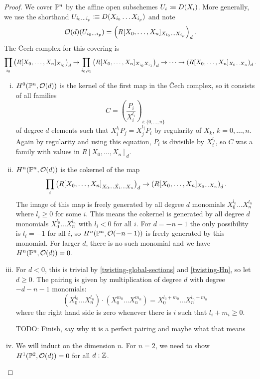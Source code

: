 \begin{proof}
  We cover $\mathbb{P}^n$ by the affine open subschemes $U_i\vcentcolon\mspace{-1.2mu}\equiv D(X_i)$.
  More generally, we use the shorthand $U_{i_0\dots i_p}\vcentcolon\mspace{-1.2mu}\equiv D(X_{i_0}\dots X_{i_p})$
  and note
  \[
    \mathcal O(d)(U_{i_0\dots i_p})=\left(R[X_0,\dots,X_n]_{X_{i_0}\dots X_{i_p}}\right)_d
    \rlap{.}
  \]
  The \v{C}ech complex for this covering is
  \[
    \prod_{i_0}\left(R[X_0,\dots,X_n]_{X_{i_0}}\right)_d \to \prod_{i_0,i_1} \left(R[X_0,\dots,X_n]_{X_{i_0} X_{i_1}}\right)_d \to \dots \to \left(R[X_0,\dots,X_n]_{X_0\dots X_n}\right)_d
    \rlap{.}
  \]
  \begin{enumerate}[(i)]
  \item\label{twisting-global-sections} $H^0(\mathbb{P}^n,\mathcal O(d))$ is the kernel of the first map in the \v{C}ech complex,
    so it consists of all families
    \[
      C=\left(\frac{P_i}{X_{i}^{l_i}}\right)_{i:\{0,\dots,n\}}
    \]
    of degree $d$ elements such that $X_i^{l_i}P_j=X_j^{l_j}P_i$ by regularity of $X_k$, $k=0,\dots,n$.
    Again by regularity and using this equation, $P_i$ is divisible by $X_i^{l_i}$, so $C$ was a family with values in $R[X_0,\dots,X_n]_d$.
  \item\label{twisting-Hn} $H^n(\mathbb{P}^n,\mathcal O(d))$ is the cokernel of the map
    \[
      \prod_{i} \left(R[X_0,\dots,X_n]_{X_0\dots \hat{X_i}\dots X_n}\right)_d \to \left(R[X_0,\dots,X_n]_{X_0\dots X_n}\right)_d
      \rlap{.}
    \]
    The image of this map is freely generated by all degree $d$ monomials $X_0^{l_0}\dots X_n^{l_n}$ where $l_i\geq 0$ for some $i$.
    This means the cokernel is generated by all degree $d$ monomials $X_0^{l_0}\dots X_n^{l_n}$ with $l_i<0$ for all $i$.
    For $d= -n-1$ the only possibility is $l_i=-1$ for all $i$, so $H^n(\mathbb{P}^n,\mathcal O(-n-1))$ is freely generated by this monomial.
    For larger $d$, there is no such monomial and we have $H^n(\mathbb{P}^n,\mathcal O(d))=0$.
  \item For $d<0$, this is trivial by \ref{twisting-global-sections} and \ref{twisting-Hn}, so let $d\geq 0$.
    The pairing is given by multiplication of degree $d$ with degree $-d-n-1$ monomials:
    \[
      (X_0^{l_0}\dots X_n^{l_n}) \cdot (X_0^{m_0}\dots X_n^{m_n})=X_0^{l_0+m_0}\dots X_n^{l_n+m_n}
    \]
    where the right hand side is zero whenever there is $i$ such that $l_i+m_i\geq 0$.
    
    TODO: Finish, say why it is a perfect pairing and maybe what that means
  \item We will induct on the dimension $n$.
    For $n=2$, we need to show $H^1(\mathbb{P}^2,\mathcal O(d))=0$ for all $d:\mathbb{Z}$.


\end{enumerate}
\end{proof}
